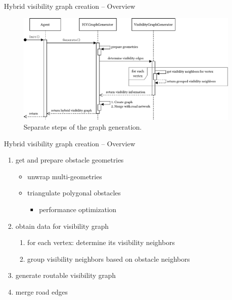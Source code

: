 \documentclass[xcolor={x11names}]{beamer}
\newenvironment{figcenter}
{%
	\parskip=0pt%
	\par%
	\nopagebreak%
	\centering%
}%
{%
	\par%
	\noindent%
	\ignorespacesafterend%
}
\begin{document}
		\begin{frame}{Hybrid visibility graph creation -- Overview}
			\begin{figure}[t]
				\begin{figcenter}
					\includegraphics[width=0.98\textwidth]{images/components-sequence-generation-short.pdf}
				\end{figcenter}
				\caption{Separate steps of the graph generation.}
			\end{figure}
		\end{frame}
		
		\begin{frame}{Hybrid visibility graph creation -- Overview}
			\begin{enumerate}
				\item get and prepare obstacle geometries
				\begin{itemize}
					\item unwrap multi-geometries
					\item triangulate polygonal obstacles
					\begin{itemize}
						\item[\textrightarrow] performance optimization
					\end{itemize}
				\end{itemize}
				\item obtain data for visibility graph
				\begin{enumerate}
					\item for each vertex: determine its visibility neighbors
					\item group visibility neighbors based on obstacle neighbors
				\end{enumerate}
				\item generate routable visibility graph
				\item merge road edges
			\end{enumerate}
		\end{frame}
		
\end{document}
